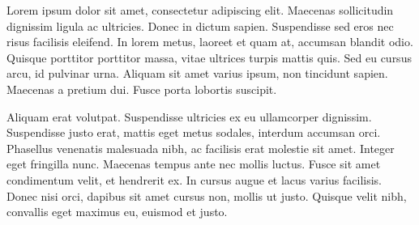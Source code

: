 \documentclass[]{article}
\date{}
\begin{document}
Lorem ipsum dolor sit amet, consectetur adipiscing elit. Maecenas
sollicitudin dignissim ligula ac ultricies. Donec in dictum sapien.
Suspendisse sed eros nec risus facilisis eleifend. In lorem metus,
laoreet et quam at, accumsan blandit odio. Quisque porttitor porttitor
massa, vitae ultrices turpis mattis quis. Sed eu cursus arcu, id
pulvinar urna. Aliquam sit amet varius ipsum, non tincidunt sapien.
Maecenas a pretium dui. Fusce porta lobortis suscipit.

Aliquam erat volutpat. Suspendisse ultricies ex eu ullamcorper
dignissim. Suspendisse justo erat, mattis eget metus sodales, interdum
accumsan orci. Phasellus venenatis malesuada nibh, ac facilisis erat
molestie sit amet. Integer eget fringilla nunc. Maecenas tempus ante nec
mollis luctus. Fusce sit amet condimentum velit, et hendrerit ex. In
cursus augue et lacus varius facilisis. Donec nisi orci, dapibus sit
amet cursus non, mollis ut justo. Quisque velit nibh, convallis eget
maximus eu, euismod et justo.
\end{document}
